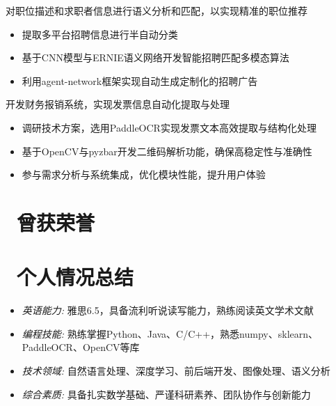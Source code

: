 \documentclass{../../styles/resume}
\begin{document}
\begin{onehalfspacing}
对职位描述和求职者信息进行语义分析和匹配，以实现精准的职位推荐
\begin{itemize}
  \item 提取多平台招聘信息进行半自动分类
  \item 基于CNN模型与ERNIE语义网络开发智能招聘匹配多模态算法
  \item 利用agent-network框架实现自动生成定制化的招聘广告
\end{itemize}
\end{onehalfspacing}

\begin{onehalfspacing}
开发财务报销系统，实现发票信息自动化提取与处理
\begin{itemize}
  \item 调研技术方案，选用PaddleOCR实现发票文本高效提取与结构化处理
  \item 基于OpenCV与pyzbar开发二维码解析功能，确保高稳定性与准确性
  \item 参与需求分析与系统集成，优化模块性能，提升用户体验
\end{itemize}
\end{onehalfspacing}



\section{\faHeartO\ 曾获荣誉}


\section{\faInfo\ 个人情况总结}
\begin{itemize}
  \item \textit{英语能力:} 雅思6.5，具备流利听说读写能力，熟练阅读英文学术文献
  \item \textit{编程技能:} 熟练掌握Python、Java、C/C++，熟悉numpy、sklearn、PaddleOCR、OpenCV等库
  \item \textit{技术领域:} 自然语言处理、深度学习、前后端开发、图像处理、语义分析
  \item \textit{综合素质:} 具备扎实数学基础、严谨科研素养、团队协作与创新能力
\end{itemize}
\end{document}
